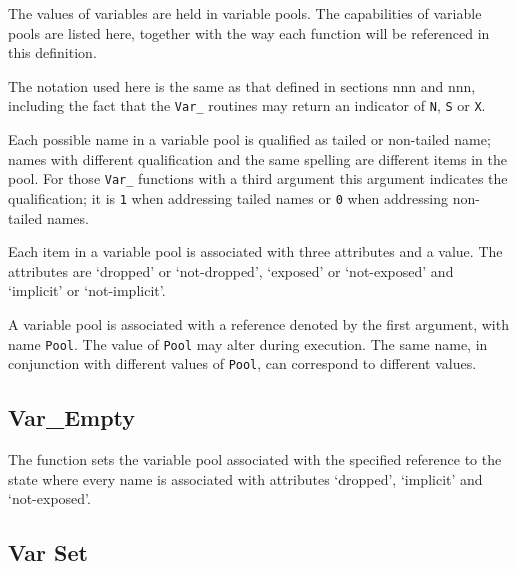The values of variables are held in variable pools. The capabilities of
variable pools are listed here, together with the way each function will
be referenced in this definition.

The notation used here is the same as that defined in sections nnn and
nnn, including the fact that the \texttt{Var\_} routines may return an
indicator of \texttt{\textquotesingle{}N\textquotesingle{}},
\texttt{\textquotesingle{}S\textquotesingle{}} or
\texttt{\textquotesingle{}X\textquotesingle{}}.

Each possible name in a variable pool is qualified as tailed or
non-tailed name; names with different qualification and the same
spelling are different items in the pool. For those \texttt{Var\_}
functions with a third argument this argument indicates the
qualification; it is \texttt{\textquotesingle{}1\textquotesingle{}} when
addressing tailed names or
\texttt{\textquotesingle{}0\textquotesingle{}} when addressing
non-tailed names.

Each item in a variable pool is associated with three attributes and a
value. The attributes are `dropped' or `not-dropped', `exposed' or
`not-exposed' and `implicit' or `not-implicit'.

A variable pool is associated with a reference denoted by the first
argument, with name \texttt{Pool}. The value of \texttt{Pool} may alter
during execution. The same name, in conjunction with different values of
\texttt{Pool}, can correspond to different values.

\subsection{Var\_Empty}\label{var_empty}



The function sets the variable pool associated with the specified
reference to the state where every name is associated with attributes
`dropped', `implicit' and `not-exposed'.

\subsection{Var Set}\label{var-set}




